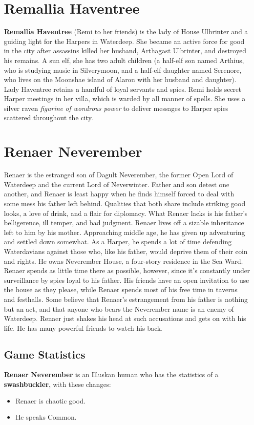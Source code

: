 \documentclass[10pt,a4paper,twoside,twocolumn,openany,nodeprecatedcode]{dndbook}
\begin{document}
\section{Remallia Haventree}
\textbf{Remallia Haventree} (Remi to her friends) is the lady of House Ulbrinter and a guiding light for the Harpers in Waterdeep. She became an active force for good in the city after assassins killed her husband, Arthagast Ulbrinter, and destroyed his remains. A sun elf, she has two adult children (a half-elf son named Arthius, who is studying music in Silverymoon, and a half-elf daughter named Serenore, who lives on the Moonshae island of Alaron with her husband and daughter). Lady Haventree retains a handful of loyal servants and spies.
Remi holds secret Harper meetings in her villa, which is warded by all manner of spells. She uses a silver raven \textit{figurine of wondrous power} to deliver messages to Harper spies scattered throughout the city.
\section{Renaer Neverember}
Renaer is the estranged son of Dagult Neverember, the former Open Lord of Waterdeep and the current Lord of Neverwinter. Father and son detest one another, and Renaer is least happy when he finds himself forced to deal with some mess his father left behind. Qualities that both share include striking good looks, a love of drink, and a flair for diplomacy. What Renaer lacks is his father's belligerence, ill temper, and bad judgment.
Renaer lives off a sizable inheritance left to him by his mother. Approaching middle age, he has given up adventuring and settled down somewhat. As a Harper, he spends a lot of time defending Waterdavians against those who, like his father, would deprive them of their coin and rights. He owns Neverember House, a four-story residence in the Sea Ward. Renaer spends as little time there as possible, however, since it's constantly under surveillance by spies loyal to his father. His friends have an open invitation to use the house as they please, while Renaer spends most of his free time in taverns and festhalls.
Some believe that Renaer's estrangement from his father is nothing but an act, and that anyone who bears the Neverember name is an enemy of Waterdeep. Renaer just shakes his head at such accusations and gets on with his life. He has many powerful friends to watch his back.
\subsection{Game Statistics}
\textbf{Renaer Neverember} is an Illuskan human who has the statistics of a \textbf{swashbuckler}, with these changes:
\begin{itemize}

\item Renaer is chaotic good.
\item He speaks Common.
\end{itemize}
\end{document}
